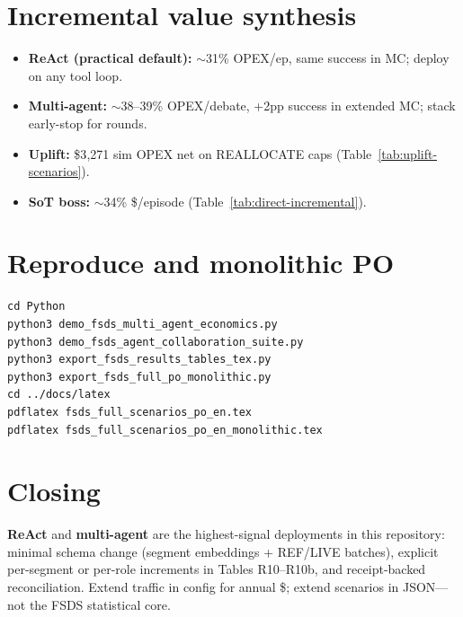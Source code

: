 \documentclass[11pt]{article}
\begin{document}
\section{Incremental value synthesis}

\begin{itemize}[nosep]
  \item \textbf{ReAct (practical default):} $\sim$31\% OPEX/ep, same success in MC; deploy on any tool loop.
  \item \textbf{Multi-agent:} $\sim$38--39\% OPEX/debate, +2pp success in extended MC; stack early-stop for rounds.
  \item \textbf{Uplift:} \$3{,}271 sim OPEX net on REALLOCATE caps (Table~\ref{tab:uplift-scenarios}).
  \item \textbf{SoT boss:} $\sim$34\% \$/episode (Table~\ref{tab:direct-incremental}).
\end{itemize}

\section{Reproduce and monolithic PO}

\begin{verbatim}
cd Python
python3 demo_fsds_multi_agent_economics.py
python3 demo_fsds_agent_collaboration_suite.py
python3 export_fsds_results_tables_tex.py
python3 export_fsds_full_po_monolithic.py
cd ../docs/latex
pdflatex fsds_full_scenarios_po_en.tex
pdflatex fsds_full_scenarios_po_en_monolithic.tex
\end{verbatim}

\section*{Closing}
\textbf{ReAct} and \textbf{multi-agent} are the highest-signal deployments in this repository: minimal schema change (segment embeddings + REF/LIVE batches), explicit per-segment or per-role increments in Tables R10--R10b, and receipt-backed reconciliation.
Extend traffic in config for annual \$; extend scenarios in JSON---not the FSDS statistical core.
\end{document}
